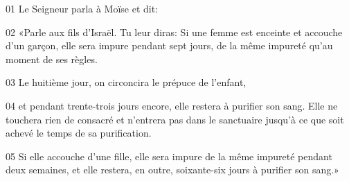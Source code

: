 01 Le Seigneur parla à Moïse et dit:

02 «Parle aux fils d’Israël. Tu leur diras: Si une femme est enceinte et accouche d’un garçon, elle sera impure pendant sept jours, de la même impureté qu’au moment de ses règles.

03 Le huitième jour, on circoncira le prépuce de l’enfant,

04 et pendant trente-trois jours encore, elle restera à purifier son sang. Elle ne touchera rien de consacré et n’entrera pas dans le sanctuaire jusqu’à ce que soit achevé le temps de sa purification.

05 Si elle accouche d’une fille, elle sera impure de la même impureté pendant deux semaines, et elle restera, en outre, soixante-six jours à purifier son sang.»
